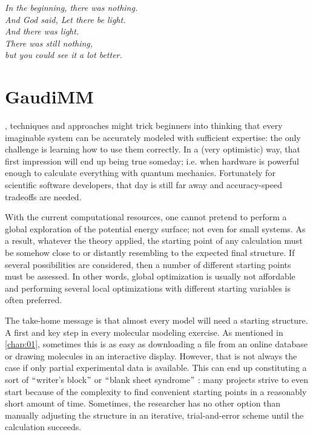 \begin{savequote}[0.6\textwidth]
	\itshape In the beginning, there was nothing. \\
	\itshape And God said, Let there be light. \\
	\itshape And there was light. \\
	\itshape There was still nothing, \\
	\itshape but you could see it a lot better.
\end{savequote}

\chapter{GaudiMM}
\label{chap:04}


, techniques and approaches might trick beginners into thinking that every imaginable system can be accurately modeled with sufficient expertise: the only challenge is learning how to use them correctly. In a (very optimistic) way, that first impression will end up being true someday; i.e. when hardware is powerful enough to calculate everything with quantum mechanics. Fortunately for scientific software developers, that day is still far away and accuracy-speed tradeoffs are needed.

With the current computational resources, one cannot pretend to perform a global exploration of the potential energy surface; not even for small systems. As a result, whatever the theory applied, the starting point of any calculation must be somehow close to or distantly resembling to the expected final structure. If several possibilities are considered, then a number of different starting points must be assessed. In other words, global optimization is usually not affordable and performing several local optimizations with different starting variables is often preferred.

The take-home message is that almost every model will need a starting structure. A first and key step in every molecular modeling exercise. As mentioned in \autoref{chap:01}, sometimes this is as easy as downloading a file from an online database or drawing molecules in an interactive display. However, that is not always the case if only partial experimental data is available. This can end up constituting a sort of $``$writer’s block$"$  or $``$blank sheet syndrome$"$ : many projects strive to even start because of the complexity to find convenient starting points in a reasonably short amount of time. Sometimes, the researcher has no other option than manually adjusting the structure in an iterative, trial-and-error scheme until the calculation succeeds.

